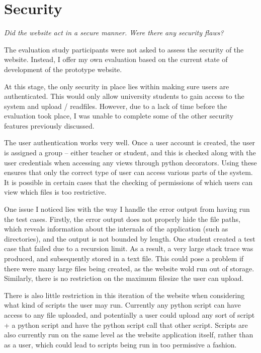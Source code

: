 \documentclass[a4paper,11pt]{report}
\begin{document}
\section{Security}
\textit{Did the website act in a secure manner. Were there any security flaws?}\par
The evaluation study participants were not asked to assess the security of the website. Instead, I offer my own evaluation based on the current state of development of the prototype website.\par
At this stage, the only security in place lies within making sure users are authenticated. This would only allow university students to gain access to the system and upload / readfiles. However, due to a lack of time before the evaluation took place, I was unable to complete some of the other security features previously discussed.\par
The user authentication works very well. Once a user account is created, the user is assigned a group -- either teacher or student, and this is checked along with the user credentials when accessing any views through python decorators. Using these ensures that only the correct type of user can access various parts of the system. It is possible in certain cases that the checking of permissions of which users can view which files is too restrictive.\par
One issue I noticed lies with the way I handle the error output from having run the test cases. Firstly, the error output does not properly hide the file paths, which reveals information about the internals of the application (such as directories), and the output is not bounded by length. One student created a test case that failed due to a recursion limit. As a result, a very large stack trace was produced, and subsequently stored in a text file. This could pose a problem if there were many large files being created, as the website wold run out of storage. Similarly, there is no restriction on the maximum filesize the user can upload.\par
There is also little restriction in this iteration of the website when considering what kind of scripts the user may run. Currently any python script can have access to any file uploaded, and potentially a user could upload any sort of script + a python script and have the python script call that other script. Scripts are also currently run on the same level as the website application itself, rather than as a user, which could lead to scripts being run in too permissive a fashion.
\end{document}
